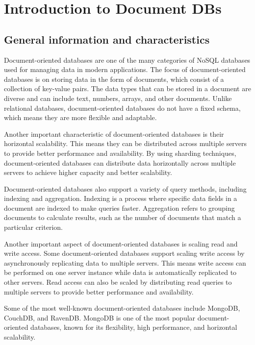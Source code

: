 
\section{Introduction to Document DBs}


\subsection{General information and characteristics}
Document-oriented databases are one of the many categories of NoSQL databases used for managing 
data in modern applications. 
The focus of document-oriented databases is on storing data in the form of documents, 
which consist of a collection of key-value pairs. The data types that can be stored in a document 
are diverse and can include text, numbers, arrays, and other documents. 
Unlike relational databases, document-oriented databases do not have a fixed schema, 
which means they are more flexible and adaptable.

Another important characteristic of document-oriented databases is their horizontal scalability. 
This means they can be distributed across multiple servers to provide better performance and 
availability. By using sharding techniques, document-oriented databases can distribute 
data horizontally across multiple servers to achieve higher capacity and better scalability.

Document-oriented databases also support a variety of query methods, including indexing and 
aggregation. Indexing is a process where specific data fields in a document are indexed to 
make queries faster. Aggregation refers to grouping documents to calculate results, such as 
the number of documents that match a particular criterion.

Another important aspect of document-oriented databases is scaling read and write access. 
Some document-oriented databases support scaling write access by asynchronously replicating 
data to multiple servers. This means write access can be performed on one server instance while 
data is automatically replicated to other servers. Read access can also be scaled by 
distributing read queries to multiple servers to provide better performance and availability.

Some of the most well-known document-oriented databases include MongoDB, CouchDB, and RavenDB. 
MongoDB is one of the most popular document-oriented databases, known for its flexibility, 
high performance, and horizontal scalability.


